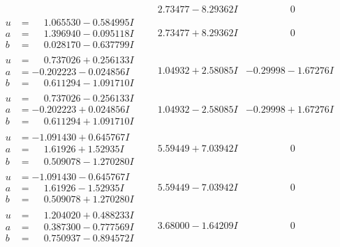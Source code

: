 \documentclass[1p]{elsarticle_modified}
\theoremstyle{definition}
\begin{document}
$$\begin{array}{c|c|c}
 & \phantom{-}2.73477 - 8.29362 I & \phantom{-0.000000 } 0 \\ \hline\begin{aligned}
u &= \phantom{-}1.065530 - 0.584995 I \\
a &= \phantom{-}1.396940 - 0.095118 I \\
b &= \phantom{-}0.028170 - 0.637799 I\end{aligned}
 & \phantom{-}2.73477 + 8.29362 I & \phantom{-0.000000 } 0 \\ \hline\begin{aligned}
u &= \phantom{-}0.737026 + 0.256133 I \\
a &= -0.202223 - 0.024856 I \\
b &= \phantom{-}0.611294 - 1.091710 I\end{aligned}
 & \phantom{-}1.04932 + 2.58085 I & -0.29998 - 1.67276 I \\ \hline\begin{aligned}
u &= \phantom{-}0.737026 - 0.256133 I \\
a &= -0.202223 + 0.024856 I \\
b &= \phantom{-}0.611294 + 1.091710 I\end{aligned}
 & \phantom{-}1.04932 - 2.58085 I & -0.29998 + 1.67276 I \\ \hline\begin{aligned}
u &= -1.091430 + 0.645767 I \\
a &= \phantom{-}1.61926 + 1.52935 I \\
b &= \phantom{-}0.509078 - 1.270280 I\end{aligned}
 & \phantom{-}5.59449 + 7.03942 I & \phantom{-0.000000 } 0 \\ \hline\begin{aligned}
u &= -1.091430 - 0.645767 I \\
a &= \phantom{-}1.61926 - 1.52935 I \\
b &= \phantom{-}0.509078 + 1.270280 I\end{aligned}
 & \phantom{-}5.59449 - 7.03942 I & \phantom{-0.000000 } 0 \\ \hline\begin{aligned}
u &= \phantom{-}1.204020 + 0.488233 I \\
a &= \phantom{-}0.387300 - 0.777569 I \\
b &= \phantom{-}0.750937 - 0.894572 I\end{aligned}
 & \phantom{-}3.68000 - 1.64209 I & \phantom{-0.000000 } 0 \\ \hline\begin{aligned}

\end{aligned}
\end{array}$$
\end{document}
